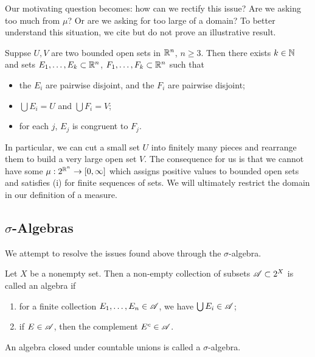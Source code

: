 \documentclass[12pt]{article} %
\begin{document}
Our motivating question becomes: how can we rectify this issue? Are we asking too much from $\mu$? Or are we asking for too large of a domain? To better understand this situation, we cite but do not prove an illustrative result.

\begin{theorem}
    Suppse $U, V$ are two bounded open sets in $\mathbb{R}^n$, $n \geq 3$. Then there exists $k
    \in \mathbb{N}$ and sets $E_1, \ldots, E_k \subset \mathbb{R}^n$, $F_1, \ldots, F_k \subset \mathbb{R}^n$ such that \begin{itemize}
        \item the $E_i$ are pairwise disjoint, and the $F_i$ are pairwise disjoint;
        \item $\bigcup E_i = U$ and $\bigcup F_i = V$;
        \item for each $j$, $E_j$ is congruent to $F_j$.
    \end{itemize}
\end{theorem}

\noindent In particular, we can cut a small set $U$ into finitely many pieces and rearrange them to build a very large open set $V$. The consequence for us is that we cannot have some $\mu : 2^{\mathbb{R}^n} \to [0,\infty]$ which assigns positive values to bounded open sets and satisfies (i) for finite sequences of sets. We will ultimately restrict the domain in our definition of a measure.

\subsection{$\sigma$-Algebras}

We attempt to resolve the issues found above through the $\sigma$-algebra.

\begin{definition}[Algebra]
    Let $X$ be a nonempty set. Then a non-empty collection of subsets $\mathscr{A} \subset 2^X$ is called an algebra if \begin{enumerate}
        \item for a finite collection $E_1, \ldots, E_n \in \mathscr{A}$, we have $\bigcup E_i \in \mathscr{A}$;
        \item if $E \in \mathscr{A}$, then the complement $E^c \in \mathscr{A}$.
    \end{enumerate}
\end{definition}

\begin{definition}
    An algebra closed under countable unions is called a $\sigma$-algebra.
\end{definition}
\end{document}
